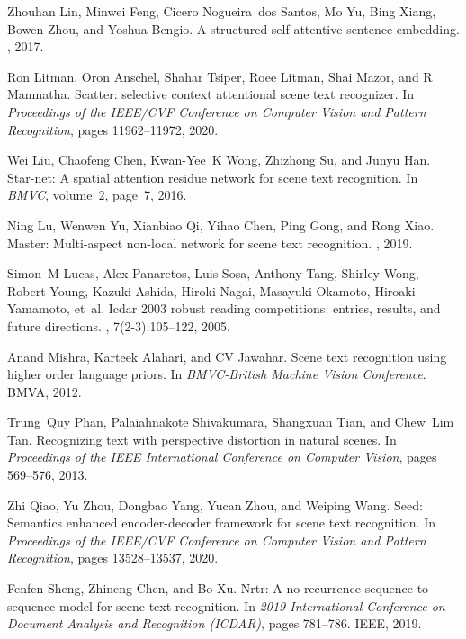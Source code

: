 \documentclass[final]{cvpr}
\begin{document}
{\begin{thebibliography}{10}
Zhouhan Lin, Minwei Feng, Cicero Nogueira~dos Santos, Mo Yu, Bing Xiang, Bowen
  Zhou, and Yoshua Bengio.
\newblock A structured self-attentive sentence embedding.
, 2017.

Ron Litman, Oron Anschel, Shahar Tsiper, Roee Litman, Shai Mazor, and R
  Manmatha.
\newblock Scatter: selective context attentional scene text recognizer.
\newblock In {\em Proceedings of the IEEE/CVF Conference on Computer Vision and
  Pattern Recognition}, pages 11962--11972, 2020.

Wei Liu, Chaofeng Chen, Kwan-Yee~K Wong, Zhizhong Su, and Junyu Han.
\newblock Star-net: A spatial attention residue network for scene text
  recognition.
\newblock In {\em BMVC}, volume~2, page~7, 2016.

Ning Lu, Wenwen Yu, Xianbiao Qi, Yihao Chen, Ping Gong, and Rong Xiao.
\newblock Master: Multi-aspect non-local network for scene text recognition.
, 2019.

Simon~M Lucas, Alex Panaretos, Luis Sosa, Anthony Tang, Shirley Wong, Robert
  Young, Kazuki Ashida, Hiroki Nagai, Masayuki Okamoto, Hiroaki Yamamoto,
  et~al.
\newblock Icdar 2003 robust reading competitions: entries, results, and future
  directions.
, 7(2-3):105--122, 2005.

Anand Mishra, Karteek Alahari, and CV Jawahar.
\newblock Scene text recognition using higher order language priors.
\newblock In {\em BMVC-British Machine Vision Conference}. BMVA, 2012.

Trung~Quy Phan, Palaiahnakote Shivakumara, Shangxuan Tian, and Chew~Lim Tan.
\newblock Recognizing text with perspective distortion in natural scenes.
\newblock In {\em Proceedings of the IEEE International Conference on Computer
  Vision}, pages 569--576, 2013.

Zhi Qiao, Yu Zhou, Dongbao Yang, Yucan Zhou, and Weiping Wang.
\newblock Seed: Semantics enhanced encoder-decoder framework for scene text
  recognition.
\newblock In {\em Proceedings of the IEEE/CVF Conference on Computer Vision and
  Pattern Recognition}, pages 13528--13537, 2020.

Fenfen Sheng, Zhineng Chen, and Bo Xu.
\newblock Nrtr: A no-recurrence sequence-to-sequence model for scene text
  recognition.
\newblock In {\em 2019 International Conference on Document Analysis and
  Recognition (ICDAR)}, pages 781--786. IEEE, 2019.


\end{thebibliography}}
\end{document}
